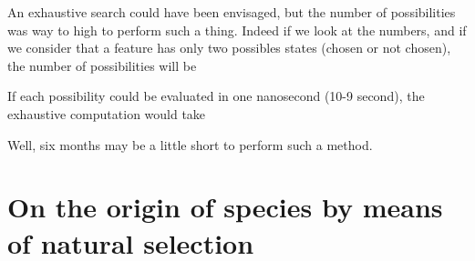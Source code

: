 \documentclass{report}
\begin{document}
		An exhaustive search could have been envisaged, but the number of possibilities was way to high to perform such a thing. Indeed if we look at the numbers, and if we consider that a feature has only two possibles states (chosen or not chosen), the number of possibilities will be
		
		
		If each possibility could be evaluated in one nanosecond (10-9 second), the exhaustive computation would take 
		
		
		Well, six months may be a little short to perform such a method.
		
		\section{On the origin of species by means of natural selection}
		
\end{document}
